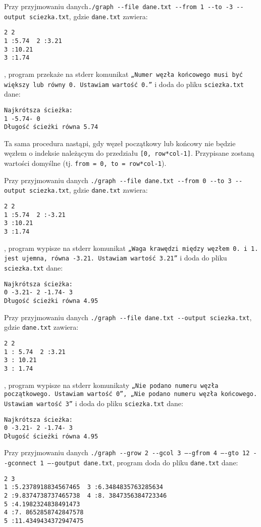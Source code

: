 \documentclass[]{article}
\begin{document}
\bigskip
\bigskip
Przy przyjmowaniu danych\texttt{./graph -{}-file dane.txt -{}-from 1 -{}-to -3 -{}-output sciezka.txt}, gdzie \texttt{dane.txt} zawiera:
\begin{verbatim}
2 2
1 :5.74  2 :3.21
3 :10.21  
3 :1.74
\end{verbatim}
, program przekaże na stderr komunikat \texttt{„Numer węzła końcowego
musi być większy lub równy 0. Ustawiam wartość 0.”} i doda do pliku \texttt{sciezka.txt} dane:
\begin{verbatim}
Najkrótsza ścieżka:
1 -5.74- 0
Długość ścieżki równa 5.74
\end{verbatim}
\bigskip
Ta sama procedura nastąpi, gdy węzeł początkowy lub końcowy nie będzie węzłem o indeksie należącym do przedziału \texttt{[0, row*col-1]}. Przypisane zostaną wartości domyślne (tj. \texttt{from = 0, to = row*col-1}).

\bigskip
\bigskip
Przy przyjmowaniu danych \texttt{./graph -{}-file dane.txt -{}-from 0 -{}-to 3 -{}-output  sciezka.txt}, gdzie \texttt{dane.txt} zawiera:
\begin{verbatim}
2 2
1 :5.74  2 :-3.21
3 :10.21  
3 :1.74
\end{verbatim}
, program wypisze na stderr komunikat \texttt{„Waga krawędzi między węzłem 0. i 1. jest ujemna, równa -3.21. Ustawiam wartość 3.21”} i doda do pliku \texttt{sciezka.txt} dane:
\begin{verbatim}
Najkrótsza ścieżka:
0 -3.21- 2 -1.74- 3
Długość ścieżki równa 4.95
\end{verbatim}

\bigskip
\bigskip
Przy przyjmowaniu danych \texttt{./graph -{}-file dane.txt -{}-output  sciezka.txt}, gdzie \texttt{dane.txt} zawiera:
\begin{verbatim}
2 2
1 : 5.74  2 :3.21
3 : 10.21  
3 : 1.74
\end{verbatim}
, program wypisze na stderr komunikaty \texttt{„Nie podano numeru węzła początkowego. Ustawiam wartość 0”, „Nie podano numeru węzła końcowego. Ustawiam wartość 3”} i doda do pliku \texttt{sciezka.txt} dane:
\begin{verbatim}
Najkrótsza ścieżka:
0 -3.21- 2 -1.74- 3
Długość ścieżki równa 4.95
\end{verbatim}

\bigskip
\bigskip
Przy przyjmowaniu danych \texttt{./graph -{}-grow 2 -{}-gcol 3 –{}-gfrom 4 –{}-gto 12 -{}-gconnect 1 –{}-goutput dane.txt}, program doda do pliku \texttt{dane.txt} dane:
\begin{verbatim}
2 3
1 :5.2378918834567465  3 :6.3484835763285634
2 :9.8374738737465738  4 :8. 3847356384723346
5 :4.1982324838491473
4 :7. 8652858742847578
5 :11.4349434372947475
\end{verbatim}
\end{document}
